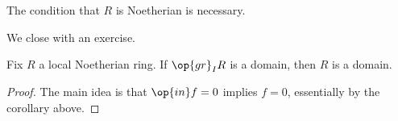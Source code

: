\begin{remark}
	The condition that $R$ is Noetherian is necessary.
\end{remark}
We close with an exercise.
\begin{exe}
	Fix $R$ a local Noetherian ring. If $\op{gr}_IR$ is a domain, then $R$ is a domain.
\end{exe}
\begin{proof}
	The main idea is that $\op{in}f=0$ implies $f=0$, essentially by the corollary above.
\end{proof}